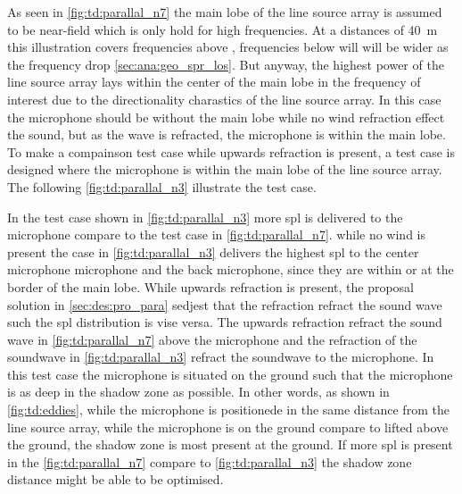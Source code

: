 
As seen in \autoref{fig:td:parallal_n7} the main lobe of the line source array is assumed to be near-field which is only hold for high frequencies. At a distances of \SI{40}{\meter} this illustration covers frequencies above , frequencies below will will be wider as the frequency drop \autoref{sec:ana:geo_spr_los}. But anyway, the highest power of the line source array lays within the center of the main lobe in the frequency of interest due to the directionality charastics of the line source array. In this case the microphone should be without the main lobe while no wind refraction effect the sound, but as the wave is refracted, the microphone is within the main lobe. To make a compainson test case while upwards refraction is present, a test case is designed where the microphone is within the main lobe of the line source array. The following \autoref{fig:td:parallal_n3} illustrate the test case.


In the test case shown in \autoref{fig:td:parallal_n3} more \gls{spl} is delivered to the microphone compare to the test case in  \autoref{fig:td:parallal_n7}. while no wind is present the case in \autoref{fig:td:parallal_n3} delivers the highest \gls{spl} to the center microphone microphone and the back microphone, since they are within or at the border of the main lobe. While upwards refraction is present, the proposal solution in \autoref{sec:des:pro_para} sedjest that the refraction refract the sound wave such the \gls{spl} distribution is vise versa. The upwards refraction refract the sound wave in \autoref{fig:td:parallal_n7} above the microphone and the refraction of the soundwave in \autoref{fig:td:parallal_n3} refract the soundwave to the microphone. In this test case the microphone is situated on the ground such that the microphone is as deep in the shadow zone as possible. In other words, as shown in \autoref{fig:td:eddies}, while the microphone is positionede in the same distance from the line source array, while the microphone is on the ground compare to lifted above the ground, the shadow zone is most present at the ground. If more \gls{spl} is present in the \autoref{fig:td:parallal_n7} compare to \autoref{fig:td:parallal_n3} the shadow zone distance might be able to be optimised.



